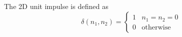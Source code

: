 The 2D unit impulse is defined as 
$$\delta(n_1, n_2) = \begin{cases}
  1 & n_1 = n_2 = 0 \\
  0 & \operatorname{otherwise}
\end{cases}$$
